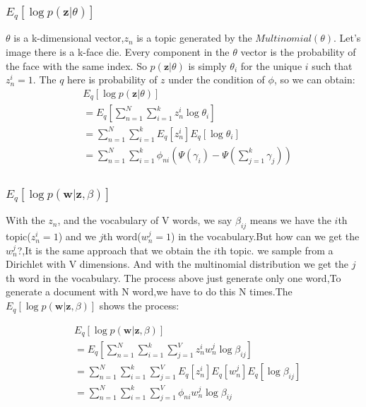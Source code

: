 \documentclass[12pt,a4paper]{article}
\begin{document}
\begin{CJK}{UTF8}{gbsn}
\subsubsection{$E_q[\log p(\textbf{z}|\theta)]$}
$\theta$ is a k-dimensional vector,$z_n$ is a topic generated by the $Multinomial(\theta)$. Let's image there is a k-face die. Every component in the $\theta$ vector is the probability of the face with the same index. So $p(\bm{z}|\theta)$ is simply $\theta_i$ for the unique $i$ such that $z_n^i = 1$. The $q$ here is probability of $z$ under the condition of $\phi$, so we can obtain:
\begin{equation*}
\begin{split}
&E_q[\log p(\textbf{z}|\theta)]\\
&= E_q[\sum_{n=1}^N \sum_{i=1}^k z_n^i\log \theta_i]\\
&= \sum_{n=1}^N \sum_{i=1}^k E_q[z_n^i]E_q[\log \theta_i]\\
&= \sum_{n=1}^N \sum_{i=1}^k \phi_{ni}\left(\Psi(\gamma_i) - \Psi(\sum_{j=1}^k \gamma_j)\right)\\
\end{split}
\end{equation*}

\subsubsection{$E_q[\log p(\textbf{w}|\textbf{z},\beta)]$}
With the $z_n$, and the vocabulary of V words, we say $\beta_{ij}$ means we have the $i$th topic($z_n^i=1$) and we $j$th word($w_n^j=1$) in the vocabulary.But how can we get the $w_n^j$?,It is the same approach that we obtain the $i$th topic. we sample from a Dirichlet with V dimensions. And with the multinomial distribution we get the $j$th word in the vocabulary. The process above just generate only one word,To generate a document with N word,we have to do this N times.The $E_q[\log p(\textbf{w}|\textbf{z},\beta)]$ shows the process:

\begin{equation*}
\begin{split}
&E_q[\log p(\bm{w}|\bm{z},\beta)]\\
&= E_q[\sum_{n=1}^N\sum_{i=1}^k\sum_{j=1}^V z_n^iw_n^j \log \beta_{ij}]\\
&=\sum_{n=1}^N\sum_{i=1}^k\sum_{j=1}^V E_q[z_n^i]E_q[w_n^j] E_q[\log \beta_{ij}]\\
&= \sum_{n=1}^N\sum_{i=1}^k\sum_{j=1}^V\phi_{ni} w_n^j \log \beta_{ij}\\
\end{split}
\end{equation*}

\end{CJK}
\end{document}
